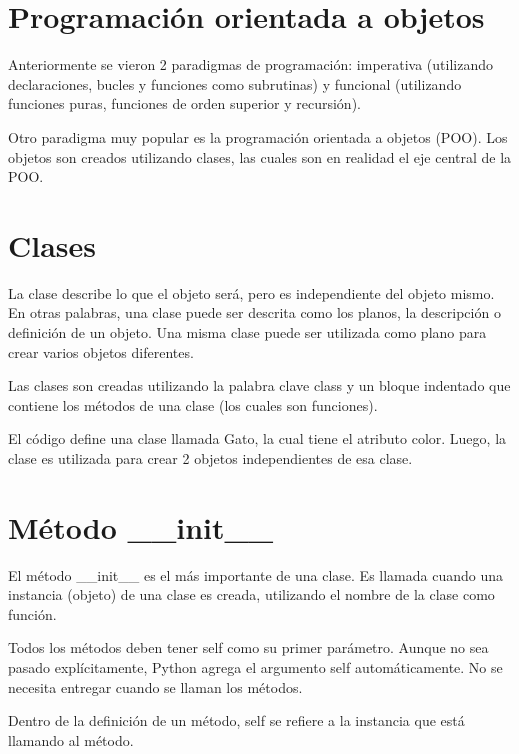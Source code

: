 \documentclass{report}
\begin{document}
{%

\section{Programación orientada a objetos}

Anteriormente se vieron 2 paradigmas de programación: imperativa (utilizando declaraciones, bucles y funciones como subrutinas) y funcional (utilizando funciones puras, funciones de orden superior y recursión).

Otro paradigma muy popular es la programación orientada a objetos (POO). Los objetos son creados utilizando clases, las cuales son en realidad el eje central de la POO.

\section{Clases}

La clase describe lo que el objeto será, pero es independiente del objeto mismo. En otras palabras, una clase puede ser descrita como los planos, la descripción o definición de un objeto. Una misma clase puede ser utilizada como plano para crear varios objetos diferentes.

Las clases son creadas utilizando la palabra clave class y un bloque indentado que contiene los métodos de una clase (los cuales son funciones).


El código define una clase llamada Gato, la cual tiene el atributo color. Luego, la clase es utilizada para crear 2 objetos independientes de esa clase.

\section{Método \_\_init\_\_}

El método \_\_init\_\_ es el más importante de una clase. Es llamada cuando una instancia (objeto) de una clase es creada, utilizando el nombre de la clase como función.

Todos los métodos deben tener self como su primer parámetro. Aunque no sea pasado explícitamente, Python agrega el argumento self automáticamente. No se necesita entregar cuando se llaman los métodos.

Dentro de la definición de un método, self se refiere a la instancia que está llamando al método.

}
\end{document}
